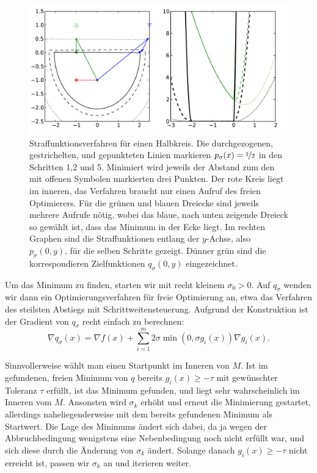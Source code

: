 \begin{figure}
  \centering
  \includegraphics[width=\textwidth]{plots/penalty}
  \caption{Straffunktionsverfahren für einen Halbkreis. Die
    durchgezogenen, gestrichelten, und gepunkteten Linien markieren
    $p_{\sigma}(x)=\nicefrac{1}{2}$ in den Schritten 1,2 und 5. Minimiert wird
    jeweils der Abstand zum den mit offenen Symbolen markierten drei
    Punkten. Der rote Kreis liegt im inneren, das Verfahren braucht
    nur einen Aufruf des freien Optimierers. Für die grünen und blauen
    Dreiecke sind jeweils mehrere Aufrufe nötig, wobei das blaue, nach
    unten zeigende Dreieck so gewählt ist, dass das Minimum in der
    Ecke liegt. Im rechten Graphen sind die Straffunktionen entlang
    der $y$-Achse, also $p_{\sigma}(0,y)$, für die selben Schritte
    gezeigt. Dünner grün sind die korrespondieren Zielfunktionen
    $q_{\sigma}(0,y)$ eingezeichnet.}
  \label{fig:penalty}
\end{figure}

Um das Minimum zu finden, starten wir mit recht kleinem
$\sigma_0>0$. Auf $q_{\sigma}$ wenden wir dann ein
Optimierungsverfahren für freie Optimierung an, etwa das Verfahren des
steilsten Abstiegs mit Schrittweitensteuerung. Aufgrund der
Konstruktion ist der Gradient von $q_{\sigma}$ recht einfach zu berechnen:
\begin{equation}
  \nabla q_{\sigma}(x) = \nabla f(x) + \sum_{i=1}^m 2\sigma\min(0,
  \sigma g_i(x))\nabla g_i(x).
\end{equation}

Sinnvollerweise wählt man einen Startpunkt im Inneren von $M$. Ist im
gefundenen, freien Minimum von $q$ bereits $g_i(x)\ge - \tau$ mit
gewünschter Toleranz $\tau$ erfüllt, ist das Minimum gefunden, und
liegt sehr wahrscheinlich im Inneren vom $M$. Ansonsten wird
$\sigma_k$ erhöht und erneut die Minimierung gestartet, allerdings
naheliegenderweise mit dem bereits gefundenen Minimum als
Startwert. Die Lage des Minimums ändert sich dabei, da ja wegen der
Abbruchbedingung wenigstens eine Nebenbedingung noch nicht erfüllt
war, und sich diese durch die Änderung von $\sigma_k$ ändert. Solange
danach $g_i(x)\ge - \tau$ nicht erreicht ist, passen wir $\sigma_k$ an
und iterieren weiter.


